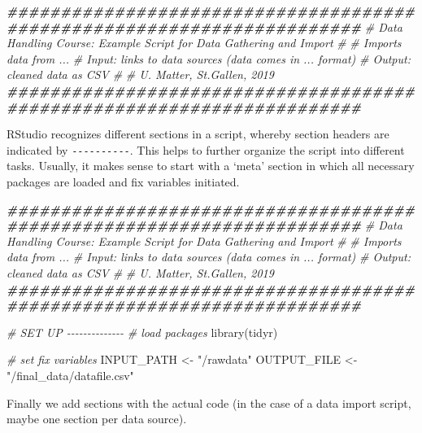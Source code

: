 \documentclass[
  12pt,
]{style/krantz}
\newenvironment{Shaded}{\begin{snugshade}}{\end{snugshade}}
\newcommand{\CommentTok}[1]{\textcolor[rgb]{0.56,0.35,0.01}{\textit{#1}}}
\newcommand{\DocumentationTok}[1]{\textcolor[rgb]{0.56,0.35,0.01}{\textbf{\textit{#1}}}}
\newcommand{\FunctionTok}[1]{\textcolor[rgb]{0.00,0.00,0.00}{#1}}
\newcommand{\NormalTok}[1]{#1}
\newcommand{\OtherTok}[1]{\textcolor[rgb]{0.56,0.35,0.01}{#1}}
\newcommand{\StringTok}[1]{\textcolor[rgb]{0.31,0.60,0.02}{#1}}
\begin{document}
\begin{Shaded}
\begin{Highlighting}[]
\DocumentationTok{\#\#\#\#\#\#\#\#\#\#\#\#\#\#\#\#\#\#\#\#\#\#\#\#\#\#\#\#\#\#\#\#\#\#\#\#\#\#\#\#\#\#\#\#\#\#\#\#\#\#\#\#\#\#\#\#\#\#\#\#\#\#\#\#\#\#\#\#\#\#\#}
\CommentTok{\# Data Handling Course: Example Script for Data Gathering and Import}
\CommentTok{\#}
\CommentTok{\# Imports data from ...}
\CommentTok{\# Input: links to data sources (data comes in ... format)}
\CommentTok{\# Output: cleaned data as CSV}
\CommentTok{\# }
\CommentTok{\# U. Matter, St.Gallen, 2019}
\DocumentationTok{\#\#\#\#\#\#\#\#\#\#\#\#\#\#\#\#\#\#\#\#\#\#\#\#\#\#\#\#\#\#\#\#\#\#\#\#\#\#\#\#\#\#\#\#\#\#\#\#\#\#\#\#\#\#\#\#\#\#\#\#\#\#\#\#\#\#\#\#\#\#\#}
\end{Highlighting}
\end{Shaded}

RStudio recognizes different sections in a script, whereby section headers are indicated by \texttt{-\/-\/-\/-\/-\/-\/-\/-\/-\/-}. This helps to further organize the script into different tasks. Usually, it makes sense to start with a `meta' section in which all necessary packages are loaded and fix variables initiated.

\begin{Shaded}
\begin{Highlighting}[]
\DocumentationTok{\#\#\#\#\#\#\#\#\#\#\#\#\#\#\#\#\#\#\#\#\#\#\#\#\#\#\#\#\#\#\#\#\#\#\#\#\#\#\#\#\#\#\#\#\#\#\#\#\#\#\#\#\#\#\#\#\#\#\#\#\#\#\#\#\#\#\#\#\#\#\#}
\CommentTok{\# Data Handling Course: Example Script for Data Gathering and Import}
\CommentTok{\#}
\CommentTok{\# Imports data from ...}
\CommentTok{\# Input: links to data sources (data comes in ... format)}
\CommentTok{\# Output: cleaned data as CSV}
\CommentTok{\# }
\CommentTok{\# U. Matter, St.Gallen, 2019}
\DocumentationTok{\#\#\#\#\#\#\#\#\#\#\#\#\#\#\#\#\#\#\#\#\#\#\#\#\#\#\#\#\#\#\#\#\#\#\#\#\#\#\#\#\#\#\#\#\#\#\#\#\#\#\#\#\#\#\#\#\#\#\#\#\#\#\#\#\#\#\#\#\#\#\#}


\CommentTok{\# SET UP {-}{-}{-}{-}{-}{-}{-}{-}{-}{-}{-}{-}{-}{-}}
\CommentTok{\# load packages}
\FunctionTok{library}\NormalTok{(tidyr)}

\CommentTok{\# set fix variables}
\NormalTok{INPUT\_PATH }\OtherTok{\textless{}{-}} \StringTok{"/rawdata"}
\NormalTok{OUTPUT\_FILE }\OtherTok{\textless{}{-}} \StringTok{"/final\_data/datafile.csv"}
\end{Highlighting}
\end{Shaded}

Finally we add sections with the actual code (in the case of a data import script, maybe one section per data source).
\end{document}
